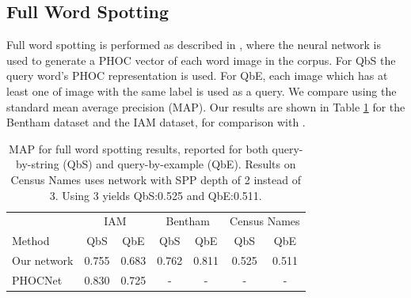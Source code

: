 \documentclass[ms,electronic,twosidetoc,letterpaper,chaptercenter,parttop,lol,lof,lot]{byumsphd}
\begin{document}
\subsection{Full Word Spotting}

Full word spotting is performed as described in \cite{sudholt2016}, where the neural network is used to generate a PHOC vector of each word image in the corpus. For QbS the query word's PHOC representation is used. For QbE, each image which has at least one of image with the same label is used as a query. We compare using the standard mean average precision (MAP). Our results are shown in Table \ref{tab:wordspottingresults} for the Bentham dataset and the IAM dataset, for comparison with \cite{sudholt2016}.

\begin{table}
\centering
\begin{tabular}{| l | c  c | c c | c c |}
  \hline
   & \multicolumn{2}{c|}{IAM} & \multicolumn{2}{c|}{Bentham} & \multicolumn{2}{c|}{Census Names}\\
  Method & QbS & QbE & QbS & QbE & QbS & QbE\\
  \hline			
  Our network & 0.755 & 0.683 & 0.762 & 0.811 & 0.525 & 0.511  %
  \\
  PHOCNet\cite{sudholt2016} & 0.830 & 0.725 & - & - & - & - \\
  \hline  
\end{tabular}
\caption{MAP for full word spotting results, reported for both query-by-string (QbS) and query-by-example (QbE). Results on Census Names uses network with SPP depth of 2 instead of 3. Using 3 yields QbS:0.525 and QbE:0.511.}
\label{tab:wordspottingresults}
\end{table}
\end{document}
